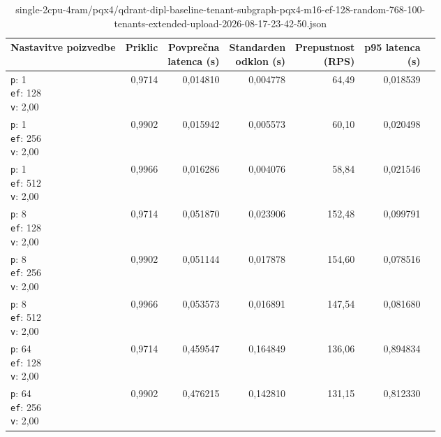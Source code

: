 \begin{table}[htbp]
  \centering
\small
  \caption{single-2cpu-4ram/pqx4/qdrant-dipl-baseline-tenant-subgraph-pqx4-m16-ef-128-random-768-100-tenants-extended-upload-2026-08-17-23-42-50.json}
  \label{tab:single-2cpu-4ram:pqx4:qdrant-dipl-baseline-tenant-subgraph-pqx4-m16-ef-128-random-768-100-tenants-extended-upload-2026-08-17-23-42-50.json}
  \begin{tabularx}{\textwidth}{Xrrrrrr}
    \toprule
    Nastavitve poizvedbe & Priklic & \makecell{Povprečna\\latenca (s)} & \makecell{Standarden\\odklon (s)} & \makecell{Prepustnost\\(RPS)} & \makecell{p95 latenca\\(s)}  \\
    \midrule
    \makecell{\texttt{p}: 1\\\texttt{ef}: 128\\\texttt{v}: 2,00} & 0,9714 & 0,014810 & 0,004778 & 64,49 & 0,018539 \\
    \makecell{\texttt{p}: 1\\\texttt{ef}: 256\\\texttt{v}: 2,00} & 0,9902 & 0,015942 & 0,005573 & 60,10 & 0,020498 \\
    \makecell{\texttt{p}: 1\\\texttt{ef}: 512\\\texttt{v}: 2,00} & 0,9966 & 0,016286 & 0,004076 & 58,84 & 0,021546 \\
    \makecell{\texttt{p}: 8\\\texttt{ef}: 128\\\texttt{v}: 2,00} & 0,9714 & 0,051870 & 0,023906 & 152,48 & 0,099791 \\
    \makecell{\texttt{p}: 8\\\texttt{ef}: 256\\\texttt{v}: 2,00} & 0,9902 & 0,051144 & 0,017878 & 154,60 & 0,078516 \\
    \makecell{\texttt{p}: 8\\\texttt{ef}: 512\\\texttt{v}: 2,00} & 0,9966 & 0,053573 & 0,016891 & 147,54 & 0,081680 \\
    \makecell{\texttt{p}: 64\\\texttt{ef}: 128\\\texttt{v}: 2,00} & 0,9714 & 0,459547 & 0,164849 & 136,06 & 0,894834 \\
    \makecell{\texttt{p}: 64\\\texttt{ef}: 256\\\texttt{v}: 2,00} & 0,9902 & 0,476215 & 0,142810 & 131,15 & 0,812330 \\

\end{tabularx}
\end{table}
